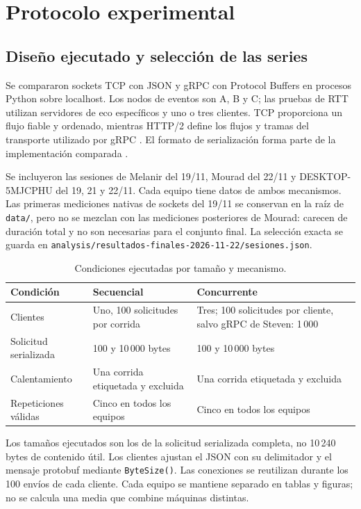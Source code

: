 \section{Protocolo experimental}
\label{sec:protocolo}
\subsection{Diseño ejecutado y selección de las series}
Se compararon sockets TCP con JSON y gRPC con Protocol Buffers en
procesos Python sobre localhost. Los nodos de eventos son A, B y C;
las pruebas de RTT utilizan servidores de eco específicos y uno o tres
clientes. TCP proporciona un flujo fiable y ordenado, mientras HTTP/2
define los flujos y tramas del transporte utilizado por gRPC
\cite{eddy2022tcp,thomson2022http2}. El formato de serialización forma
parte de la implementación comparada \cite{jackson2024streaming}.

Se incluyeron las sesiones de Melanir del 19/11, Mourad del 22/11 y
DESKTOP-5MJCPHU del 19, 21 y 22/11. Cada equipo tiene datos de ambos
mecanismos. Las primeras mediciones nativas de sockets del 19/11 se
conservan en la raíz de \texttt{data/}, pero no se mezclan con las
mediciones posteriores de Mourad: carecen de duración total y no son
necesarias para el conjunto final. La selección exacta se guarda en
\texttt{analysis/resultados-finales-2026-11-22/sesiones.json}.

\begin{table}[htbp]\centering\small
\caption{Condiciones ejecutadas por tamaño y mecanismo.}
\begin{tabularx}{\linewidth}{lXX}
\toprule
Condición & Secuencial & Concurrente \\
\midrule
Clientes & Uno, 100 solicitudes por corrida & Tres; 100 solicitudes por cliente, salvo gRPC de Steven: 1\,000 \\
Solicitud serializada & 100 y 10\,000 bytes & 100 y 10\,000 bytes \\
Calentamiento & Una corrida etiquetada y excluida & Una corrida etiquetada y excluida \\
Repeticiones válidas & Cinco en todos los equipos & Cinco en todos los equipos \\
\bottomrule
\end{tabularx}\end{table}

Los tamaños ejecutados son los de la solicitud serializada completa,
no 10\,240 bytes de contenido útil. Los clientes ajustan el JSON con
su delimitador y el mensaje protobuf mediante \texttt{ByteSize()}.
Las conexiones se reutilizan durante los 100 envíos de cada cliente.
Cada equipo se mantiene separado en tablas y figuras; no se calcula
una media que combine máquinas distintas.

